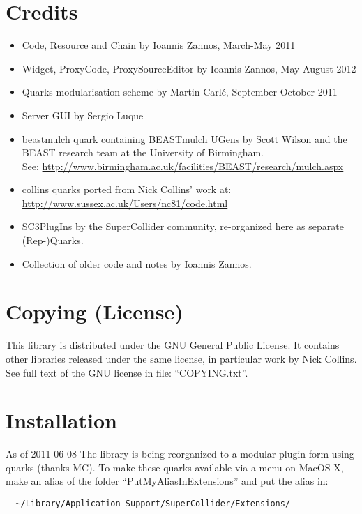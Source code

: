 \documentclass[11pt, a4paper]{scrartcl}
\begin{document}
\section*{Credits}
\label{sec-3}

\begin{itemize}
\item Code, Resource and Chain by Ioannis Zannos, March-May 2011
\item Widget, ProxyCode, ProxySourceEditor by Ioannis Zannos, May-August 2012
\item Quarks modularisation scheme by Martin Carl\'e, September-October 2011
\item Server GUI by Sergio Luque
\item beastmulch quark containing BEASTmulch UGens by Scott Wilson and the 
  BEAST research team at the University of Birmingham. \\ See: \href{http://www.birmingham.ac.uk/facilities/BEAST/research/mulch.aspx}{http://www.birmingham.ac.uk/facilities/BEAST/research/mulch.aspx}
\item collins quarks ported from Nick Collins' work at: \href{http://www.sussex.ac.uk/Users/nc81/code.html}{http://www.sussex.ac.uk/Users/nc81/code.html}
\item SC3PlugIns by the SuperCollider community, re-organized here as separate (Rep-)Quarks.
\item Collection of older code and notes by Ioannis Zannos.
\end{itemize}
\section*{Copying (License)}
\label{sec-4}


This library is distributed under the GNU General Public License. It contains other libraries released under the same license, in particular work by Nick Collins. See full text of the GNU license in file: ``COPYING.txt''.
\section*{Installation}
\label{sec-5}


As of 2011-06-08 The library is being reorganized to a modular plugin-form using quarks (thanks MC). To make these quarks available via a menu on MacOS X, make an alias of the folder ``PutMyAliasInExtensions'' and put the alias in:

\begin{verbatim}
  ~/Library/Application Support/SuperCollider/Extensions/
\end{verbatim}
\end{document}
